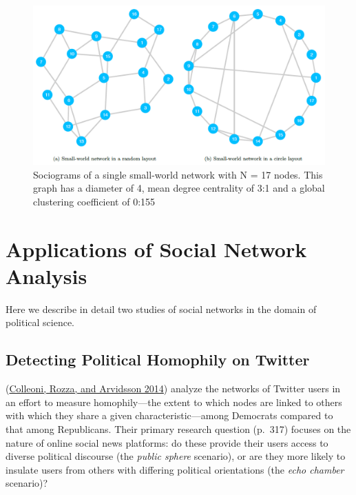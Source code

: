 \documentclass{book}
\begin{document}
\begin{figure}
\hypertarget{fig:fig11-13}{%
\centering
\includegraphics{images/social-networks/11-13.png}
\caption{Sociograms of a single small-world network with N = 17 nodes. This
graph has a diameter of 4, mean degree centrality of 3:1 and a global
clustering coefficient of 0:155}\label{fig:fig11-13}
}
\end{figure}

\hypertarget{applications-of-social-network-analysis}{%
\section{Applications of Social Network
Analysis}\label{applications-of-social-network-analysis}}

Here we describe in detail two studies of social networks in the domain of
political science.

\hypertarget{detecting-political-homophily-on-twitter}{%
\subsection{Detecting Political Homophily on
Twitter}\label{detecting-political-homophily-on-twitter}}

(\protect\hyperlink{ref-ColleoniEtAl2014}{Colleoni, Rozza, and Arvidsson
2014}) analyze the networks of Twitter users in an effort to measure
homophily---the extent to which nodes are linked to others with which they
share a given characteristic---among Democrats compared to that among
Republicans. Their primary research question (p.~317) focuses on the nature of
online social news platforms: do these provide their users access to diverse
political discourse (the \emph{public sphere} scenario), or are they more
likely to insulate users from others with differing political orientations
(the \emph{echo chamber} scenario)?
\end{document}
